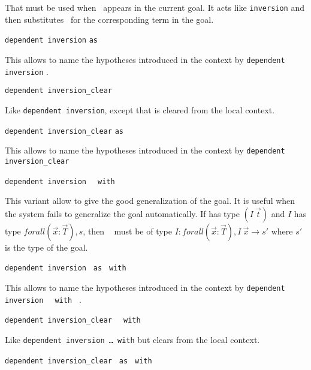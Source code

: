 \begin{Variants}
  That must be used when \ident\ appears in the current goal.  It acts
  like \texttt{inversion} and then substitutes \ident\ for the
  corresponding term in the goal.
  
\item {} \texttt{dependent
    inversion} {\ident} \texttt{as} {\intropattern} 
  
  This allows to name the hypotheses introduced in the context by
  \texttt{dependent inversion} {\ident}.

\item {} \texttt{dependent
    inversion\_clear} {\ident} 
  
  Like \texttt{dependent inversion}, except that {\ident} is cleared
  from the local context.

\item {}
  \texttt{dependent inversion\_clear} {\ident}\texttt{as} {\intropattern}
  
  This allows to name the hypotheses introduced in the context by
  \texttt{dependent inversion\_clear} {\ident}

\item {} \texttt{dependent
    inversion } {\ident} \texttt{ with } \term  
  
  This variant allow to give the good generalization of the goal. It
  is useful when the system fails to generalize the goal automatically. If
  {\ident} has type $(I~\vec{t})$ and $I$ has type
  $forall (\vec{x}:\vec{T}), s$,   then \term~  must be of type
  $I:forall (\vec{x}:\vec{T}), I~\vec{x}\to s'$ where $s'$ is the
  type of the goal.

\item {}
  \texttt{dependent inversion } {\ident} \texttt{as} {\intropattern}
  \texttt{ with } \term  
  
  This allows to name the hypotheses introduced in the context by
  \texttt{dependent inversion } {\ident} \texttt{ with } \term.

\item {}
  \texttt{dependent inversion\_clear } {\ident} \texttt{ with } \term 
  
  Like \texttt{dependent inversion \dots\ with} but clears \ident from
  the local context.

\item {}
  \texttt{dependent inversion\_clear } {\ident} \texttt{as}
  {\intropattern} \texttt{ with } \term 
  

\end{Variants}
